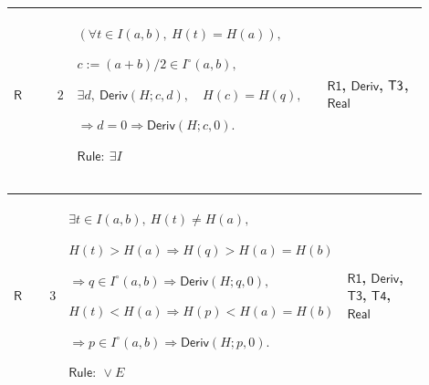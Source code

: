 \documentclass[12pt,reqno]{amsart}
\theoremstyle{blueplain}
\numberwithin{equation}{section}
\begin{document}
{\scriptsize \setlength{\parskip}{0pt}\nointerlineskip
\noindent 
\begin{tabular}{|@{}>{\centering\arraybackslash}m{0.10658\linewidth}|>{\centering\arraybackslash}m{0.03553\linewidth}|>{\centering\arraybackslash}m{0.52105\linewidth}|>{\centering\arraybackslash}m{0.23684\linewidth}|}
\hline
\hypertarget{proof:R2}{$\displaystyle \mathsf{R}$} & $\displaystyle 2$ & $%
\displaystyle (\forall t\in I(a,b),\ H(t)=H(a)),$\par$\displaystyle %
c:=(a+b)/2\in I^\circ(a,b),$\par$\displaystyle \exists d,\ \mathsf{Deriv}%
(H;c,d),\quad H(c)=H(q),$\par$\displaystyle \Rightarrow d=0\Rightarrow%
\mathsf{Deriv}(H;c,0).$\par$\displaystyle \mathsf{Rule}:\ \exists I$ & 
\hyperlink{proof:R1}{$\displaystyle \mathsf{R1}$}, \hyperlink{def:Deriv}{$%
\displaystyle \mathsf{Deriv}$}, \hyperlink{proof:T3}{$\displaystyle \mathsf{%
T3}$}, \hyperlink{ax:Real}{$\displaystyle \mathsf{Real}$} \\ \hline
\end{tabular}%
}

{\scriptsize \setlength{\parskip}{0pt}\nointerlineskip
\noindent 
\begin{tabular}{|@{}>{\centering\arraybackslash}m{0.10658\linewidth}|>{\centering\arraybackslash}m{0.03553\linewidth}|>{\centering\arraybackslash}m{0.52105\linewidth}|>{\centering\arraybackslash}m{0.23684\linewidth}|}
\hline
\hypertarget{proof:R3}{$\displaystyle \mathsf{R}$} & $\displaystyle 3$ & $%
\displaystyle \exists t\in I(a,b),\ H(t)\ne H(a),$\par$\displaystyle %
H(t)>H(a)\Rightarrow H(q)>H(a)=H(b)$\par$\displaystyle \Rightarrow q\in
I^\circ(a,b)\Rightarrow\mathsf{Deriv}(H;q,0),$\par$\displaystyle %
H(t)<H(a)\Rightarrow H(p)<H(a)=H(b)$\par$\displaystyle \Rightarrow p\in
I^\circ(a,b)\Rightarrow\mathsf{Deriv}(H;p,0).$\par$\displaystyle \mathsf{Rule%
}:\ \lor E$ & \hyperlink{proof:R1}{$\displaystyle \mathsf{R1}$}, \hyperlink{def:Deriv}%
{$\displaystyle \mathsf{Deriv}$}, \hyperlink{proof:T3}{$\displaystyle 
\mathsf{T3}$}, \hyperlink{proof:T4}{$\displaystyle \mathsf{T4}$}, \hyperlink{ax:Real}%
{$\displaystyle \mathsf{Real}$} \\ \hline
\end{tabular}%
}
\end{document}
